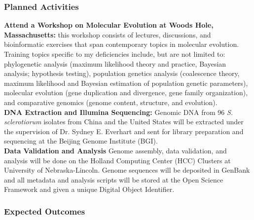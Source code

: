 \documentclass[12pt,letterpaper]{article}
\begin{document}

\subsubsection*{Planned Activities}

\noindent \textbf{Attend a Workshop on Molecular Evolution at Woods Hole, Massachusetts:} this workshop consists of lectures, discussions, and bioinformatic exercises that span contemporary topics in molecular evolution. Training topics specific to my deficiencies include, but are not limited to: phylogenetic analysis (maximum likelihood theory and practice, Bayesian analysis; hypothesis testing), population genetics analysis (coalescence theory, maximum likelihood and Bayesian estimation of population genetic parameters), molecular evolution (gene duplication and divergence, gene family organization), and comparative genomics (genome content, structure, and evolution).\\
\noindent \textbf{DNA Extraction and Illumina Sequencing:} Genomic DNA from 96 \textit{S. sclerotiorum} isolates from China and the United States will be extracted under the supervision of Dr. Sydney E. Everhart and sent for library preparation and sequencing at the Beijing Genome Institute (BGI). \\
\noindent \textbf{Data Validation and Analysis} Genome assembly, data validation, and analysis will be done on the Holland Computing Center (HCC) Clusters at University of Nebraska-Lincoln. Genome sequences will be deposited in GenBank and all metadata and analysis scripts will be stored at the Open Science Framework and given a unique Digital Object Identifier.


\subsubsection*{Expected Outcomes}
\end{document}
